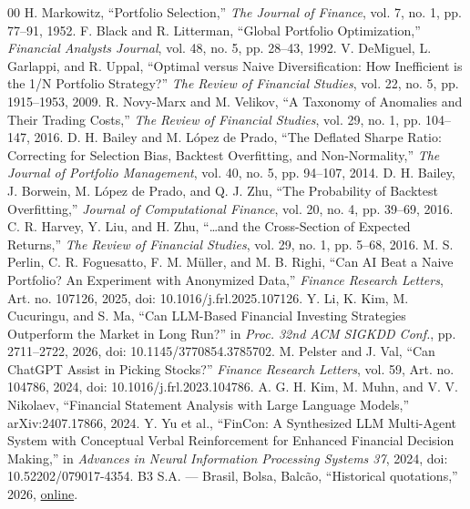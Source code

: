 \documentclass[10pt,conference]{IEEEtran}
\begin{document}
\clearpage
\begin{thebibliography}{00}
 H. Markowitz, ``Portfolio Selection,'' \emph{The Journal of Finance}, vol. 7, no. 1, pp. 77--91, 1952.
 F. Black and R. Litterman, ``Global Portfolio Optimization,'' \emph{Financial Analysts Journal}, vol. 48, no. 5, pp. 28--43, 1992.
 V. DeMiguel, L. Garlappi, and R. Uppal, ``Optimal versus Naive Diversification: How Inefficient is the 1/N Portfolio Strategy?'' \emph{The Review of Financial Studies}, vol. 22, no. 5, pp. 1915--1953, 2009.
 R. Novy-Marx and M. Velikov, ``A Taxonomy of Anomalies and Their Trading Costs,'' \emph{The Review of Financial Studies}, vol. 29, no. 1, pp. 104--147, 2016.
 D. H. Bailey and M. L\'opez de Prado, ``The Deflated Sharpe Ratio: Correcting for Selection Bias, Backtest Overfitting, and Non-Normality,'' \emph{The Journal of Portfolio Management}, vol. 40, no. 5, pp. 94--107, 2014.
 D. H. Bailey, J. Borwein, M. L\'opez de Prado, and Q. J. Zhu, ``The Probability of Backtest Overfitting,'' \emph{Journal of Computational Finance}, vol. 20, no. 4, pp. 39--69, 2016.
 C. R. Harvey, Y. Liu, and H. Zhu, ``\ldots and the Cross-Section of Expected Returns,'' \emph{The Review of Financial Studies}, vol. 29, no. 1, pp. 5--68, 2016.
 M. S. Perlin, C. R. Foguesatto, F. M. M\"uller, and M. B. Righi, ``Can AI Beat a Naive Portfolio? An Experiment with Anonymized Data,'' \emph{Finance Research Letters}, Art. no. 107126, 2025, doi: 10.1016/j.frl.2025.107126.
 Y. Li, K. Kim, M. Cucuringu, and S. Ma, ``Can LLM-Based Financial Investing Strategies Outperform the Market in Long Run?'' in \emph{Proc. 32nd ACM SIGKDD Conf.}, pp. 2711--2722, 2026, doi: 10.1145/3770854.3785702.
 M. Pelster and J. Val, ``Can ChatGPT Assist in Picking Stocks?'' \emph{Finance Research Letters}, vol. 59, Art. no. 104786, 2024, doi: 10.1016/j.frl.2023.104786.
 A. G. H. Kim, M. Muhn, and V. V. Nikolaev, ``Financial Statement Analysis with Large Language Models,'' arXiv:2407.17866, 2024.
 Y. Yu et al., ``FinCon: A Synthesized LLM Multi-Agent System with Conceptual Verbal Reinforcement for Enhanced Financial Decision Making,'' in \emph{Advances in Neural Information Processing Systems 37}, 2024, doi: 10.52202/079017-4354.
 B3 S.A. --- Brasil, Bolsa, Balc\~ao, ``Historical quotations,'' 2026, \href{https://www.b3.com.br/pt_br/market-data-e-indices/servicos-de-dados/market-data/historico/mercado-a-vista/cotacoes-historicas/}{online}.

\end{thebibliography}
\end{document}
